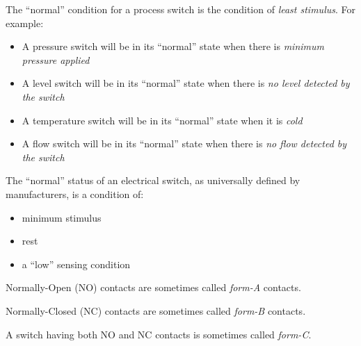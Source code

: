





The ``normal'' condition for a process switch is the condition of {\it least stimulus}.  For example:

\vskip 10pt

\begin{itemize}
\item{} A pressure switch will be in its ``normal'' state when there is {\it minimum pressure applied}
\vskip 10pt
\item{} A level switch will be in its ``normal'' state when there is {\it no level detected by the switch}
\vskip 10pt
\item{} A temperature switch will be in its ``normal'' state when it is {\it cold}
\vskip 10pt
\item{} A flow switch will be in its ``normal'' state when there is {\it no flow detected by the switch}
\end{itemize}







The ``normal'' status of an electrical switch, as universally defined by manufacturers, is a condition of:

\begin{itemize}
\item{} minimum stimulus
\item{} rest
\item{} a ``low'' sensing condition
\end{itemize}

Normally-Open (NO) contacts are sometimes called {\it form-A} contacts.

\vskip 10pt

Normally-Closed (NC) contacts are sometimes called {\it form-B} contacts.

\vskip 10pt

A switch having both NO and NC contacts is sometimes called {\it form-C}.






